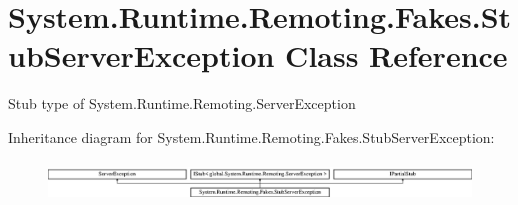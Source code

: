 \hypertarget{class_system_1_1_runtime_1_1_remoting_1_1_fakes_1_1_stub_server_exception}{\section{System.\-Runtime.\-Remoting.\-Fakes.\-Stub\-Server\-Exception Class Reference}
\label{class_system_1_1_runtime_1_1_remoting_1_1_fakes_1_1_stub_server_exception}
}


Stub type of System.\-Runtime.\-Remoting.\-Server\-Exception 


Inheritance diagram for System.\-Runtime.\-Remoting.\-Fakes.\-Stub\-Server\-Exception\-:\begin{figure}[H]
\begin{center}
\leavevmode
\includegraphics[height=1.063628cm]{class_system_1_1_runtime_1_1_remoting_1_1_fakes_1_1_stub_server_exception}
\end{center}
\end{figure}
